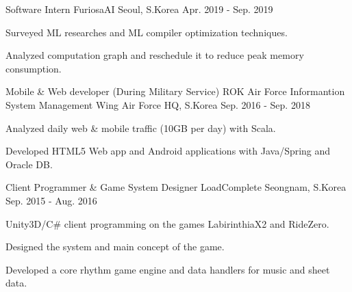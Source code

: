 

\begin{cventries}

  \cventry
  {Software Intern} %
  {FuriosaAI} %
  {Seoul, S.Korea} %
  {Apr. 2019 - Sep. 2019} %
  {
    \begin{cvitems} %
      \item {Surveyed ML researches and ML compiler optimization techniques.}
      \item {Analyzed computation graph and reschedule it to reduce peak memory consumption.}
    \end{cvitems}
  }

  \cventry
  {Mobile \& Web developer (During Military Service)} %
  {ROK Air Force Informantion System Management Wing} %
  {Air Force HQ, S.Korea} %
  {Sep. 2016 - Sep. 2018} %
  {
    \begin{cvitems} %
      \item {Analyzed daily web \& mobile traffic (10GB per day) with Scala.}
      \item {Developed HTML5 Web app and Android applications with Java/Spring and Oracle DB.}
    \end{cvitems}
  }

  \cventry
  {Client Programmer \& Game System Designer} %
  {LoadComplete} %
  {Seongnam, S.Korea} %
  {Sep. 2015 - Aug. 2016} %
  {
    \begin{cvitems} %
      \item {Unity3D/C\# client programming on the games LabirinthiaX2 and RideZero.}
      \item {Designed the system and main concept of the game.}
      \item {Developed a core rhythm game engine and data handlers for music and sheet data.}
    \end{cvitems}
  }
\end{cventries}
